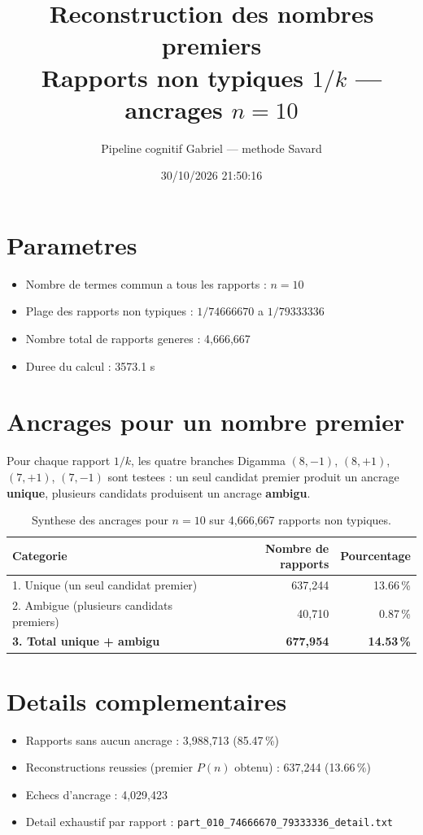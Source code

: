 \documentclass[12pt]{article}
\title{Reconstruction des nombres premiers\\Rapports non typiques $1/k$ --- ancrages $n=10$
}
\author{Pipeline cognitif Gabriel --- methode Savard}
\date{30/10/2026 21:50:16}
\begin{document}
\maketitle

\section*{Parametres}
\begin{itemize}
\item Nombre de termes commun a tous les rapports : $n=10$
\item Plage des rapports non typiques : $1/74666670$ a $1/79333336$
\item Nombre total de rapports generes : 4,666,667
\item Duree du calcul : 3573.1 s
\end{itemize}

\section*{Ancrages pour un nombre premier}

Pour chaque rapport $1/k$, les quatre branches Digamma $(8,-1)$, $(8,+1)$, $(7,+1)$, $(7,-1)$ sont testees : un seul candidat premier produit un ancrage \textbf{unique}, plusieurs candidats produisent un ancrage \textbf{ambigu}.

\begin{table}[h!]
\centering
\caption{Synthese des ancrages pour $n=10$ sur 4,666,667 rapports non typiques.}
\begin{tabular}{lrr}
\toprule
\textbf{Categorie} & \textbf{Nombre de rapports} & \textbf{Pourcentage} \\
\midrule
1. Unique (un seul candidat premier) & 637,244 & 13.66\,\% \\
2. Ambigue (plusieurs candidats premiers) & 40,710 & 0.87\,\% \\
\midrule
\textbf{3. Total unique + ambigu} & \textbf{677,954} & \textbf{14.53\,\%} \\
\bottomrule
\end{tabular}
\end{table}

\section*{Details complementaires}
\begin{itemize}
\item Rapports sans aucun ancrage : 3,988,713 (85.47\,\%)
\item Reconstructions reussies (premier $P(n)$ obtenu) : 637,244 (13.66\,\%)
\item Echecs d'ancrage : 4,029,423
\item Detail exhaustif par rapport : \texttt{part_010_74666670_79333336_detail.txt}
\end{itemize}
\end{document}
